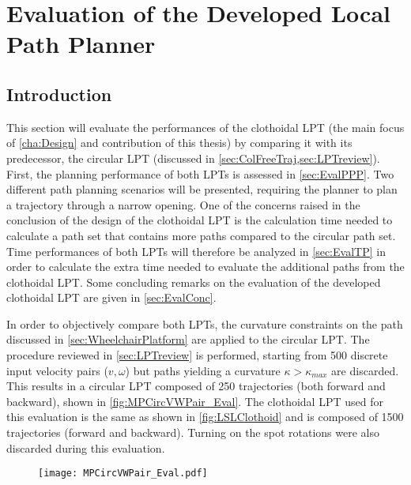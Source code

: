 \chapter{Evaluation of the Developed Local Path Planner} \label{cha:Eval}

\section{Introduction}
This section will evaluate the performances of the clothoidal LPT (the main focus of \cref{cha:Design} and contribution of this thesis) by comparing it with its predecessor, the circular LPT (discussed in \cref{sec:ColFreeTraj,sec:LPTreview}). First, the planning performance of both LPTs is assessed in \cref{sec:EvalPPP}. Two different path planning scenarios will be presented, requiring the planner to plan a trajectory through a narrow opening. One of the concerns raised in the conclusion of the design of the clothoidal LPT is the calculation time needed to calculate a path set that contains more paths compared to the circular path set. Time performances of both LPTs will therefore be analyzed in \cref{sec:EvalTP} in order to calculate the extra time needed to evaluate the additional paths from the clothoidal LPT. Some concluding remarks on the evaluation of the developed clothoidal LPT are given in \cref{sec:EvalConc}.

In order to objectively compare both LPTs, the curvature constraints on the path discussed in \cref{sec:WheelchairPlatform} are applied to the circular LPT. The procedure reviewed in \cref{sec:LPTreview} is performed, starting from 500 discrete input velocity pairs ($v,\omega$) but paths yielding a curvature $\kappa > \kappa_{max}$ are discarded. This results in a circular LPT composed of 250 trajectories (both forward and backward), shown in \cref{fig:MPCircVWPair_Eval}. The clothoidal LPT used for this evaluation is the same as shown in \cref{fig:LSLClothoid} and is composed of 1500 trajectories (forward and backward). Turning on the spot rotations were also discarded during this evaluation. 

\begin{figure}[!htbp]
	\centering
	\texttt{[image: MPCircVWPair\_Eval.pdf]}
\end{figure}

